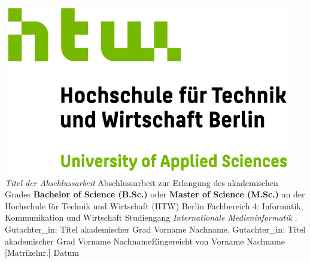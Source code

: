 \documentclass[oneside,bibliography=totocnumbered,BCOR=5mm]{scrbook}%
\theoremstyle{definition}
\theoremstyle{definition}
\theoremstyle{definition}
\theoremstyle{definition}
\theoremstyle{definition}
\theoremstyle{definition}
\begin{document}
\begin{titlepage}
\begin{center}
\includegraphics{HTW_Berlin_Logo_farbig.jpg}
\linebreak[4]
\linebreak[4]
\linebreak[4]
\linebreak[4]
\textit{\large Titel der Abschlussarbeit}
\linebreak[4]
\linebreak[4]
\linebreak[4]
Abschlussarbeit 
\linebreak[4]
\linebreak[4]
zur Erlangung des akademischen Grades 
\linebreak[4]
\linebreak[4]
\textbf{Bachelor of Science (B.Sc.)} oder \textbf{Master of Science (M.Sc.)}
\linebreak[4]
\linebreak[4]
an der
\linebreak[4]
\linebreak[4]
Hochschule f\"ur Technik und Wirtschaft (HTW) Berlin
\linebreak[4]
Fachbereich 4: Informatik, Kommunikation und Wirtschaft
\linebreak[4]
Studiengang \textit{Internationale Medieninformatik}
\linebreak[4]
\linebreak[4]
. Gutachter\_in: Titel akademischer Grad Vorname Nachname. Gutachter\_in: Titel akademischer Grad Vorname Nachname\linebreak[4]
\linebreak[4]
\linebreak[4]
\linebreak[4]
\linebreak[4]
Eingereicht von Vorname Nachname [Matrikelnr.]
\linebreak[4]
\linebreak[4]
\linebreak[4]
\linebreak[4]
Datum

\end{center}
\end{titlepage}
\newpage    %
\end{document}
